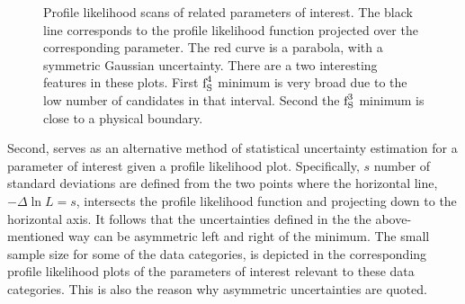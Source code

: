 \begin{figure}[!h]
  \begin{subfigure}{0.5\textwidth}
    \raggedright
    \scalebox{0.54}{}
    \caption{}
    \label{nll_ASMag2_bin3}
  \end{subfigure}%
  \hfill%
  \begin{subfigure}{0.5\textwidth}
    \raggedleft
    \scalebox{0.54}{}
    \caption{}
    \label{nll_ASPhase_bin3}
  \end{subfigure}
  \begin{subfigure}{0.5\textwidth}
    \raggedright
    \scalebox{0.54}{}
    \caption{}
    \label{nll_ASMag2_bin4}
  \end{subfigure}%
  \hfill%
  \begin{subfigure}{0.5\textwidth}
    \raggedleft
    \scalebox{0.54}{}
    \caption{}
    \label{nll_ASPhase_bin4}
  \end{subfigure}
\caption{Profile likelihood scans of \swave related parameters of interest. The black line corresponds to the profile likelihood
         function projected over the corresponding parameter. The red curve is a parabola, with a symmetric Gaussian
         uncertainty. There are a two interesting features in these plots. First $\text{f}_{\text{S}}^{4}$ minimum is very broad due to the
         low number of candidates in that \mkpi interval. Second the $\text{f}_{\text{S}}^{3}$ minimum is close to a physical boundary.}
\end{figure}

Second,  serves as an alternative method of statistical uncertainty estimation for a
parameter of interest given a profile likelihood plot. Specifically, $s$ number of standard deviations are defined from
the two points where the horizontal line, $-\Delta\ln L = s$,  intersects the profile likelihood function and projecting down
to the horizontal axis. It follows that the uncertainties defined in the the above-mentioned way can be asymmetric
left and right of the minimum. The small sample size for some of the data categories, is depicted in the corresponding
profile likelihood plots of the parameters of interest relevant to these data categories. This is also the reason why
asymmetric uncertainties are quoted.

